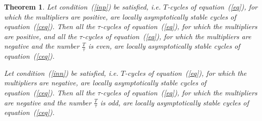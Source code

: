 \documentclass[12pt,a4paper]{amsart}
\newtheorem{theorem}{Theorem}
\begin{document}
\begin{theorem}\label{t4}
Let condition~(\ref{inp}) be satisfied, i.e. $T$-cycles of equation~(\ref{eq}), for which the multipliers are positive, are locally asymptotically stable cycles 
of equation~(\ref{ceq}). Then all the $\tau$-cycles of equation~(\ref{eq}), for which the multipliers are positive, and all the $\tau$-cycles of 
equation~(\ref{eq}), for which the multipliers are negative and the number $\frac{T}{\tau}$ is even, are locally asymptotically stable cycles of 
equation~(\ref{ceq}).

Let condition~(\ref{inn}) be satisfied, i.e. $T$-cycles of equation~(\ref{eq}), for which the multipliers are negative, are locally asymptotically stable cycles 
of equation~(\ref{ceq}). Then all the $\tau$-cycles of equation~(\ref{eq}), for which the multipliers are negative and the number $\frac{T}{\tau}$ is odd, 
are locally asymptotically stable cycles of equation~(\ref{ceq}).
\end{theorem}
\end{document}
